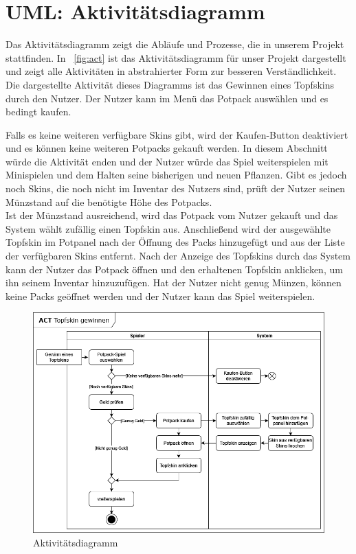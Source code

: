 \chapter{UML: Aktivitätsdiagramm}\label{ch:uml_act}
Das Aktivitätsdiagramm zeigt die Abläufe und Prozesse, die in unserem Projekt stattfinden.
In ~\autoref{fig:act} ist das Aktivitätsdiagramm für unser Projekt dargestellt und zeigt alle Aktivitäten in 
abstrahierter Form zur besseren Verständlichkeit. \\
\newline
Die dargestellte Aktivität dieses Diagramms ist das Gewinnen eines Topfskins durch den Nutzer.
Der Nutzer kann im Menü das Potpack auswählen und es bedingt kaufen.

Falls es keine weiteren verfügbare Skins gibt, wird der Kaufen-Button deaktiviert und es können keine weiteren
Potpacks gekauft werden.
In diesem Abschnitt würde die Aktivität enden und der Nutzer würde das Spiel weiterspielen mit Minispielen und dem 
Halten seine bisherigen und neuen Pflanzen.
Gibt es jedoch noch Skins, die noch nicht im Inventar des Nutzers sind, prüft der Nutzer seinen Münzstand auf die 
benötigte Höhe des Potpacks.\\
Ist der Münzstand ausreichend, wird das Potpack vom Nutzer gekauft und das System wählt zufällig einen Topfskin aus.
Anschließend wird der ausgewählte Topfskin im Potpanel nach der Öffnung des Packs hinzugefügt und aus der Liste der
verfügbaren Skins entfernt. 
Nach der Anzeige des Topfskins durch das System kann der Nutzer das Potpack öffnen und den erhaltenen Topfskin anklicken, 
um ihn seinem Inventar hinzuzufügen.
Hat der Nutzer nicht genug Münzen, können keine Packs geöffnet werden und der Nutzer kann das Spiel weiterspielen.\\

\begin{figure}[h]
    \centering
    \includegraphics[width=0.8\linewidth]{../bilder/act_potpack}
    \vspace{0.05cm}
    \caption{Aktivitätsdiagramm}
    \label{fig:act}
\end{figure}